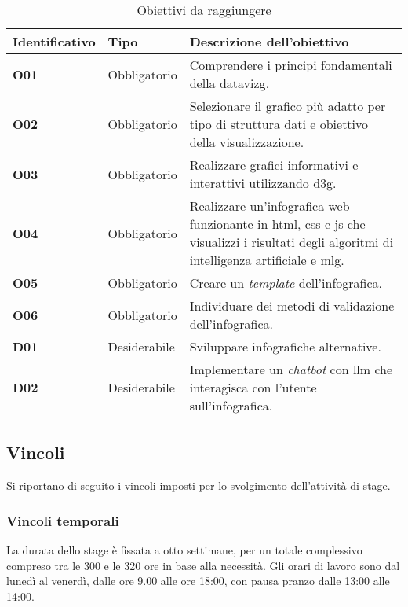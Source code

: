 \renewcommand{\arraystretch}{1.5}
\begin{table}[H]
    \centering
    \begin{tabular}{|>{\centering\arraybackslash} m{} |>{\centering\arraybackslash} m{} |>{\centering\arraybackslash} m{}|}
        \hline
        \rowcolor{gray!20}
        \textbf{Identificativo} & \textbf{Tipo} & \textbf{Descrizione dell'obiettivo} \\
        \hline
        \textbf{O01} & Obbligatorio & Comprendere i principi fondamentali della \gls{datavizg}. \\
        \hline
        \textbf{O02} & Obbligatorio & Selezionare il grafico più adatto per tipo di struttura dati e obiettivo della visualizzazione. \\
        \hline
        \textbf{O03} & Obbligatorio & Realizzare grafici informativi e interattivi utilizzando \gls{d3g}. \\
        \hline
        \textbf{O04} & Obbligatorio & Realizzare un'infografica web funzionante in \gls{html}, \gls{css} e \gls{js} che visualizzi i risultati degli algoritmi di intelligenza artificiale e \gls{mlg}. \\
        \hline
        \textbf{O05} & Obbligatorio & Creare un \emph{template} dell'infografica. \\
        \hline
        \textbf{O06} & Obbligatorio & Individuare dei metodi di validazione dell'infografica. \\
        \hline
        \textbf{D01} & Desiderabile & Sviluppare infografiche alternative. \\
        \hline
        \textbf{D02} & Desiderabile & Implementare un \emph{chatbot} con \gls{llm} che interagisca con l'utente sull'infografica. \\
        \hline
    \end{tabular}
    \vspace{0.2cm}
    \caption{Obiettivi da raggiungere}
    \label{tab:obiettivi}
\end{table}


\subsection{Vincoli}
Si riportano di seguito i vincoli imposti per lo svolgimento dell'attività di stage.

\subsubsection{Vincoli temporali}
La durata dello stage è fissata a otto settimane, per un totale complessivo compreso tra le 300 e le 320 ore in base alla necessità.
Gli orari di lavoro sono dal lunedì al venerdì, dalle ore 9.00 alle ore 18:00, con pausa pranzo dalle 13:00 alle 14:00.

